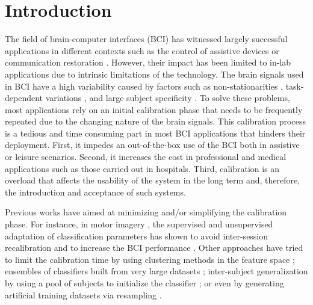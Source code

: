 
\section{Introduction}
\label{sec:intro}

The field of brain-computer interfaces (BCI) has witnessed largely successful applications in different contexts such as the control of assistive devices or communication restoration \cite{millan10}. However, their impact has been limited to in-lab applications due to intrinsic limitations of the technology. The brain signals used in BCI have a high variability caused by factors such as non-stationarities \cite{vidaurre2010towards}, task-dependent variations \cite{Iturrate2013task	}, and large subject specificity \cite{blankertz2010single}. To solve these problems, most applications rely on an initial calibration phase that needs to be frequently repeated due to the changing nature of the brain signals. This calibration process is a tedious and time consuming part in most BCI applications that hinders their deployment. First, it impedes an out-of-the-box use of the BCI both in assistive or leisure scenarios. Second, it increases the cost in professional and medical applications such as those carried out in hospitals. Third,  calibration is an overload that affects the usability of the system in the long term and, therefore, the introduction and acceptance of such systems.

Previous works have aimed at minimizing and/or simplifying the calibration phase. For instance, in motor imagery \cite{millan10}, the supervised and unsupervised adaptation of classification parameters has shown to avoid inter-session recalibration \cite{vidaurre11} and to increase the BCI performance \cite{vidaurre11b}. Other approaches have tried to limit the calibration time by using clustering methods in the feature space \cite{krauledat2006reducing}; ensembles of classifiers built from very large datasets \cite{fazli2009subject}; inter-subject generalization by using a pool of subjects to initialize the classifier \cite{iturrate2011minimizing, faller2012autocalibration, lotte2010learning}; or even by generating artificial training datasets via resampling \cite{lotte:inria-00599325}.

